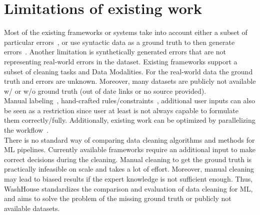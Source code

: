 \section{Limitations of existing work}

Most of the existing frameworks or systems take into account either a subset of particular errors~\cite{boostclean, raha, baran, jenga}, or use syntactic data as a ground truth to then generate errors~\cite{gouda, bart}. 
Another limitation is synthetically generated errors that are not representing real-world errors in the dataset. Existing frameworks support a subset of cleaning tasks and Data Modalities.
For the real-world data the ground truth and errors are unknown. Moreover, many datasets are publicly not available w/ or w/o ground truth (out of date links or no source provided).
\\
Manual labeling~\cite{raha, baran}, hand-crafted rules/constraints~\cite{bart, gouda}, additional user inputs can also be seen as a restriction 
since user at least is not always capable to formulate them correctly/fully. %
Additionally, existing work can be optimized by parallelizing the workflow~\cite{raha, baran, holoclean, holodetect, gouda, jenga}.
\\
There is no standard way of comparing data cleaning algorithms and methods for ML pipelines. 
Currently available frameworks require an additional input to make correct decisions during the cleaning. Manual cleaning to get the ground truth is practically infeasible on scale and takes a lot of effort.
Moreover, manual cleaning may lead to biased results if the expert knowledge is not sufficient enough.
Thus, WashHouse standardizes the comparison and evaluation of data cleaning for ML, and aims to solve the problem of the missing ground truth or publicly not available datasets.
